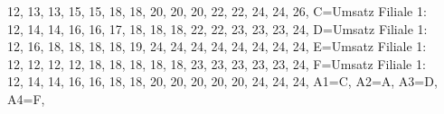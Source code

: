 \begin{beispiel}[WS 1.2]{1}
{{{								12, 13, 13, 15, 15, 18, 18, 20, 20, 20, 22, 22, 24, 24, 26}}, 				%
								C={\scriptsize{Umsatz Filiale 1:\\
								12, 14, 14, 16, 16, 17, 18, 18, 18, 22, 22, 23, 23, 23, 24}}, 				%
								D={\scriptsize{Umsatz Filiale 1:\\
								12, 16, 18, 18, 18, 18, 19, 24, 24, 24, 24, 24, 24, 24, 24}}, 				%
								E={\scriptsize{Umsatz Filiale 1:\\
								12, 12, 12, 12, 18, 18, 18, 18, 18, 23, 23, 23, 23, 23, 24}}, 				%
								F={\scriptsize{Umsatz Filiale 1:\\
								12, 14, 14, 16, 16, 18, 18, 20, 20, 20, 20, 20, 24, 24, 24}}, 				%
								A1={C},				%
								A2={A},				%
								A3={D},				%
								A4={F},				%
								}
\end{beispiel}